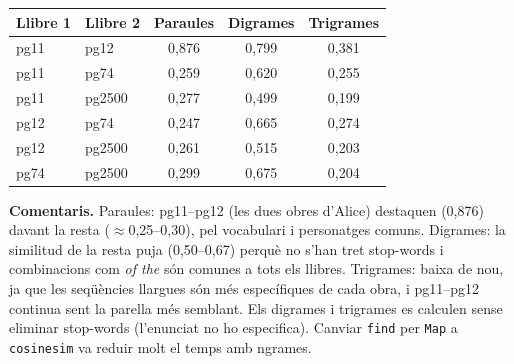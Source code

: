 \documentclass[10pt,a4paper,twocolumn]{article}
\begin{document}
\begin{center}
\small
\begin{tabular}{llccc}
\toprule
Llibre 1 & Llibre 2 & Paraules & Digrames & Trigrames \\
\midrule
pg11 & pg12   & 0,876 & 0,799 & 0,381 \\
pg11 & pg74   & 0,259 & 0,620 & 0,255 \\
pg11 & pg2500 & 0,277 & 0,499 & 0,199 \\
pg12 & pg74   & 0,247 & 0,665 & 0,274 \\
pg12 & pg2500 & 0,261 & 0,515 & 0,203 \\
pg74 & pg2500 & 0,299 & 0,675 & 0,204 \\
\bottomrule
\end{tabular}
\end{center}

\small
\textbf{Comentaris.} Paraules: pg11--pg12 (les dues obres d'Alice) destaquen
(0,876) davant la resta (${\approx}$0,25--0,30), pel vocabulari i personatges
comuns. Digrames: la similitud de la resta puja (0,50--0,67) perquè no s'han
tret stop-words i combinacions com \emph{of the} són comunes a tots els llibres.
Trigrames: baixa de nou, ja que les seqüències llargues són més específiques de
cada obra, i pg11--pg12 continua sent la parella més semblant. Els digrames i
trigrames es calculen sense eliminar stop-words (l'enunciat no ho especifica).
Canviar \texttt{find} per \texttt{Map} a \texttt{cosinesim} va reduir molt el
temps amb ngrames.
\end{document}
